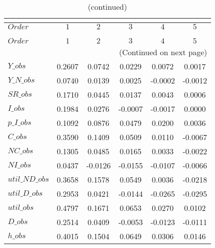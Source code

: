  
\begin{center}
\begin{longtable}{lccccc} 
\caption{COEFFICIENTS OF AUTOCORRELATION}\\
 \label{Table:th_autocorr_matrix}\\
\toprule 
$Order          $	 & 	 $         1$	 & 	 $         2$	 & 	 $         3$	 & 	 $         4$	 & 	 $         5$\\
\midrule \endfirsthead 
\caption{(continued)}\\
 \toprule \\ 
$Order          $	 & 	 $         1$	 & 	 $         2$	 & 	 $         3$	 & 	 $         4$	 & 	 $         5$\\
\midrule \endhead 
\midrule \multicolumn{6}{r}{(Continued on next page)} \\ \bottomrule \endfoot 
\bottomrule \endlastfoot 
$Y\_obs         $	 & 	    0.2607	 & 	    0.0742	 & 	    0.0229	 & 	    0.0072	 & 	    0.0017 \\ 
$Y\_N\_obs      $	 & 	    0.0740	 & 	    0.0139	 & 	    0.0025	 & 	   -0.0002	 & 	   -0.0012 \\ 
$SR\_obs        $	 & 	    0.1710	 & 	    0.0445	 & 	    0.0137	 & 	    0.0043	 & 	    0.0006 \\ 
$I\_obs         $	 & 	    0.1984	 & 	    0.0276	 & 	   -0.0007	 & 	   -0.0017	 & 	    0.0000 \\ 
$p\_I\_obs      $	 & 	    0.1092	 & 	    0.0876	 & 	    0.0479	 & 	    0.0200	 & 	    0.0036 \\ 
$C\_obs         $	 & 	    0.3590	 & 	    0.1409	 & 	    0.0509	 & 	    0.0110	 & 	   -0.0067 \\ 
$NC\_obs        $	 & 	    0.1305	 & 	    0.0485	 & 	    0.0165	 & 	    0.0033	 & 	   -0.0022 \\ 
$NI\_obs        $	 & 	    0.0437	 & 	   -0.0126	 & 	   -0.0155	 & 	   -0.0107	 & 	   -0.0066 \\ 
$util\_ND\_obs  $	 & 	    0.3658	 & 	    0.1578	 & 	    0.0549	 & 	    0.0036	 & 	   -0.0218 \\ 
$util\_D\_obs   $	 & 	    0.2953	 & 	    0.0421	 & 	   -0.0144	 & 	   -0.0265	 & 	   -0.0295 \\ 
$util\_obs      $	 & 	    0.4797	 & 	    0.1671	 & 	    0.0653	 & 	    0.0270	 & 	    0.0102 \\ 
$D\_obs         $	 & 	    0.2514	 & 	    0.0409	 & 	   -0.0053	 & 	   -0.0123	 & 	   -0.0111 \\ 
$h\_obs         $	 & 	    0.4015	 & 	    0.1504	 & 	    0.0649	 & 	    0.0306	 & 	    0.0146 \\ 
\end{longtable}
 \end{center}
